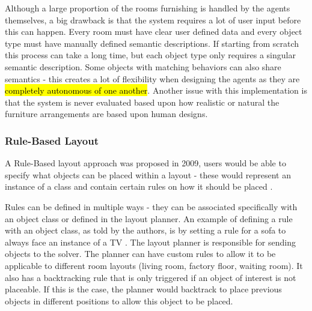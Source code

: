 
Although a large proportion of the rooms furnishing is handled by the agents themselves, a big drawback is that the system requires a lot of user input before this can happen. Every room must have clear user defined data and every object type must have manually defined semantic descriptions. If starting from scratch this process can take a long time, but each object type only requires a singular semantic description. Some objects with matching behaviors can also share semantics - this creates a lot of flexibility when designing the agents as they are \hl{completely autonomous of one another}\cite{real-time-walkthroughs}.
Another issue with this implementation is that the system is never evaluated based upon how realistic or natural the furniture arrangements are based upon human designs. 


\bigskip
\subsubsection{Rule-Based Layout}
A Rule-Based layout approach was proposed in 2009, users would be able to specify what objects can be placed within a layout - these would represent an instance of a class and contain certain rules on how it should be placed \cite{rule-based-layout}.


Rules can be defined in multiple ways - they can be associated specifically with an object class or defined in the layout planner.
An example of defining a rule with an object class, as told by the authors, is by setting a rule for a sofa to always face an instance of a TV \cite{rule-based-layout}. 
The layout planner is responsible for sending objects to the solver. The planner can have custom rules to allow it to be applicable to different room layouts (living room, factory floor, waiting room). It also has a backtracking rule that is only triggered if an object of interest is not placeable. If this is the case, the planner would backtrack to place previous objects in different positions to allow this object to be placed.


